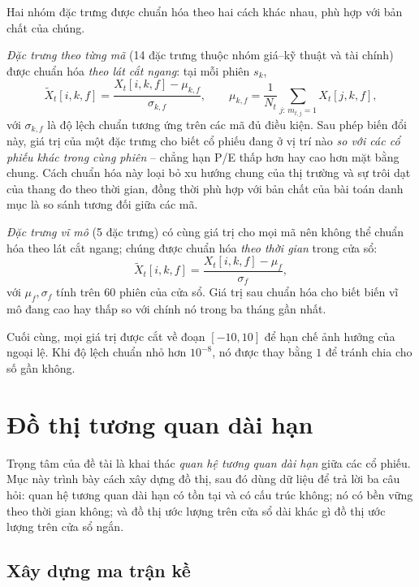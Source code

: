 Hai nhóm đặc trưng được chuẩn hóa theo hai cách khác nhau, phù hợp với bản chất của chúng.

\textit{Đặc trưng theo từng mã} (14 đặc trưng thuộc nhóm giá--kỹ thuật và tài chính) được chuẩn hóa \emph{theo lát cắt ngang}: tại mỗi phiên $s_k$,
\begin{equation}
\tilde X_t[i,k,f]=\frac{X_t[i,k,f]-\mu_{k,f}}{\sigma_{k,f}},\qquad
\mu_{k,f}=\frac{1}{N_t}\sum_{j:\,m_{t,j}=1}X_t[j,k,f],
\label{eq:xsec}
\end{equation}
với $\sigma_{k,f}$ là độ lệch chuẩn tương ứng trên các mã đủ điều kiện. Sau phép biến đổi này, giá trị của một đặc trưng cho biết cổ phiếu đang ở vị trí nào \emph{so với các cổ phiếu khác trong cùng phiên} -- chẳng hạn P/E thấp hơn hay cao hơn mặt bằng chung. Cách chuẩn hóa này loại bỏ xu hướng chung của thị trường và sự trôi dạt của thang đo theo thời gian, đồng thời phù hợp với bản chất của bài toán danh mục là so sánh tương đối giữa các mã.

\textit{Đặc trưng vĩ mô} (5 đặc trưng) có cùng giá trị cho mọi mã nên không thể chuẩn hóa theo lát cắt ngang; chúng được chuẩn hóa \emph{theo thời gian} trong cửa sổ:
\begin{equation}
\tilde X_t[i,k,f]=\frac{X_t[i,k,f]-\mu_f}{\sigma_f},
\label{eq:tsnorm}
\end{equation}
với $\mu_f,\sigma_f$ tính trên 60 phiên của cửa sổ. Giá trị sau chuẩn hóa cho biết biến vĩ mô đang cao hay thấp so với chính nó trong ba tháng gần nhất.

Cuối cùng, mọi giá trị được cắt về đoạn $[-10,10]$ để hạn chế ảnh hưởng của ngoại lệ. Khi độ lệch chuẩn nhỏ hơn $10^{-8}$, nó được thay bằng $1$ để tránh chia cho số gần không.

\section{Đồ thị tương quan dài hạn}
\label{sec:graph}

Trọng tâm của đề tài là khai thác \emph{quan hệ tương quan dài hạn} giữa các cổ phiếu. Mục này trình bày cách xây dựng đồ thị, sau đó dùng dữ liệu để trả lời ba câu hỏi: quan hệ tương quan dài hạn có tồn tại và có cấu trúc không; nó có bền vững theo thời gian không; và đồ thị ước lượng trên cửa sổ dài khác gì đồ thị ước lượng trên cửa sổ ngắn.

\subsection{Xây dựng ma trận kề}

